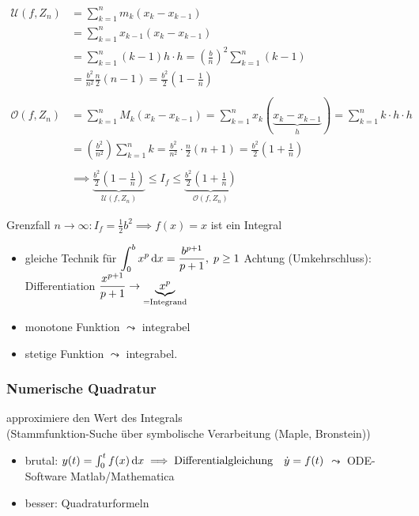 \begin{align*}
	\mathcal U(f,Z_n) 
	&= \sum_{k=1}^n m_k(x_k-x_{k-1}) \\
	&= \sum_{k=1}^n x_{k-1}(x_k-x_{k-1}) \\
	&= \sum_{k=1}^n (k-1)h \cdot h = \left( \frac{b}{n} \right)^2 \sum_{k=1}^n (k-1) \\
	&= \frac{b^2}{n^2} \frac{n}{2}(n-1) = \frac{b^2}{2}\left(1-\frac{1}{n}\right) \\
	\\
	\mathcal O(f,Z_n)
	&=\sum_{k=1}^n M_k(x_k-x_{k-1}) = \sum_{k=1}^n x_k(\underbrace{x_k-x_{k-1}}_{h}) = \sum_{k=1}^n k \cdot h \cdot h \\
	&= \left(\frac{b^2}{n^2}\right)\sum_{k=1}^n k = \frac{b^2}{n^2} \cdot \frac{n}{2}(n+1) = \frac{b^2}{2}\left(1+\frac{1}{n}\right) \\
	\\
	&\implies \underbrace{ \frac{b^2}{2}\left(1-\frac{1}{n}\right) }_{\mathcal U(f,Z_n)}\leq I_f \leq \underbrace{\frac{b^2}{2}\left(1+\frac{1}{n}\right)}_{\mathcal O(f,Z_n)}
\end{align*}

\noindent Grenzfall \( n \rightarrow \infty : I_f = \frac{1}{2}b^2 \implies f(x) = x \) ist ein Integral

\begin{note}
	\begin{itemize}
		\item gleiche Technik für \( \displaystyle\int_0^b x^p\,\mathrm{d}x= \frac{b^{p+1}}{p+1}, \;p \geq 1 \)
		\newline Achtung (Umkehrschluss): Differentiation \( \displaystyle\frac{x^{p+1}}{p+1} \rightarrow \underbrace{x^p}_{=\text{Integrand}} \)
		\item monotone Funktion \( \leadsto \) integrabel
		\item stetige Funktion \( \leadsto \) integrabel.
	\end{itemize}	
\end{note} 

\subsubsection*{Numerische Quadratur}
approximiere den Wert des Integrals\\
(Stammfunktion-Suche über symbolische Verarbeitung (Maple, Bronstein))

\begin{itemize}
	\item brutal: \( y(t) = \int_0^t f(x) \,\mathrm d x \implies \text{Differentialgleichung} \quad \dot{y} = f(t) \) \newline \( \leadsto \) ODE-Software Matlab/Mathematica
	\item besser: Quadraturformeln
\end{itemize}

